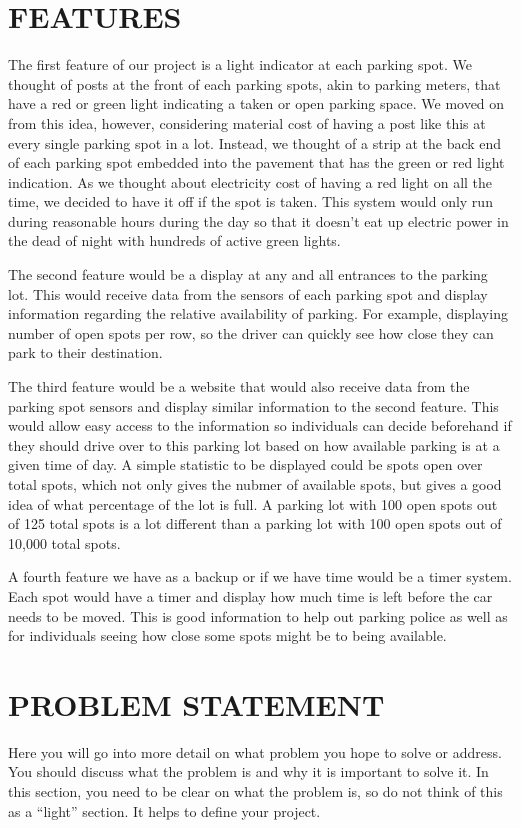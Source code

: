 \documentclass[12pt]{article}
\begin{document}
\section{FEATURES}

 
The first feature of our project is a light indicator at each parking spot. We thought of posts at the front of each parking spots, akin to parking meters, that have a red or green light indicating a taken or open parking space. We moved on from this idea, however, considering material cost of having a post like this at every single parking spot in a lot. Instead, we thought of a strip at the back end of each parking spot embedded into the pavement that has the green or red light indication. As we thought about electricity cost of having a red light on all the time, we decided to have it off if the spot is taken. This system would only run during reasonable hours during the day so that it doesn't eat up electric power in the dead of night with hundreds of active green lights.

The second feature would be a display at any and all entrances to the parking lot. This would receive data from the sensors of each parking spot and display information regarding the relative availability of parking. For example, displaying number of open spots per row, so the driver can quickly see how close they can park to their destination.

The third feature would be a website that would also receive data from the parking spot sensors and display similar information to the second feature. This would allow easy access to the information so individuals can decide beforehand if they should drive over to this parking lot based on how available parking is at a given time of day. A simple statistic to be displayed could be spots open over total spots, which not only gives the nubmer of available spots, but gives a good idea of what percentage of the lot is full. A parking lot with 100 open spots out of 125 total spots is a lot different than a parking lot with 100 open spots out of 10,000 total spots.

A fourth feature we have as a backup or if we have time would be a timer system. Each spot would have a timer and display how much time is left before the car needs to be moved. This is good information to help out parking police as well as for individuals seeing how close some spots might be to being available.





\section{PROBLEM STATEMENT}
Here you will go into more detail on what problem you hope to solve or address.  You should discuss what the problem is and why it is important to solve it. In this section, you need to be clear on what the problem is, so do not think of this as a ``light'' section. It helps to define your project.
\end{document}
